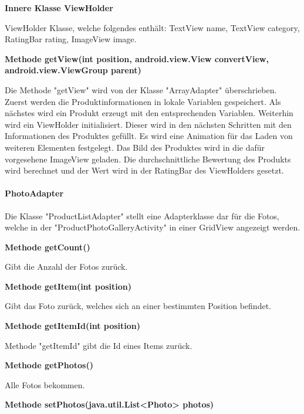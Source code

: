 \documentclass{scrartcl}
\begin{document}
\noindent\textbf{Innere Klasse ViewHolder}

\noindent ViewHolder Klasse, welche folgendes enthält: TextView name, TextView category, RatingBar rating, ImageView image. \newline 

\noindent\textbf{Methode getView(int position, \newline                                android.view.View convertView, android.view.ViewGroup parent)}

\noindent Die Methode "getView" wird von der Klasse "ArrayAdapter" überschrieben. Zuerst werden die Produktinformationen in lokale Variablen gespeichert. Als nächstes wird ein Produkt erzeugt mit den entsprechenden Variablen. Weiterhin wird ein ViewHolder initialisiert. Dieser wird in den nächsten Schritten mit den Informationen des Produktes gefüllt. Es wird eine Animation für das Laden von weiteren Elementen festgelegt. Das Bild des Produktes wird in die dafür vorgesehene ImageView geladen. Die durchschnittliche Bewertung des Produkts wird berechnet und der Wert wird in der RatingBar des ViewHolders gesetzt. \newline 

\paragraph{PhotoAdapter}
Die Klasse "ProductListAdapter" stellt eine Adapterklasse dar für die Fotos, welche in der "ProductPhotoGalleryActivity" in einer GridView angezeigt werden. \newline 

\noindent\textbf{Methode getCount()}

\noindent Gibt die Anzahl der Fotos zurück. \newline 

\noindent\textbf{Methode getItem(int position)}

\noindent Gibt das Foto zurück, welches sich an einer bestimmten Position befindet. \newline 

\noindent\textbf{Methode getItemId(int position)}

\noindent Methode "getItemId" gibt die Id eines Items zurück. \newline 

\noindent\textbf{Methode getPhotos()}

\noindent Alle Fotos bekommen. \newline 

\noindent\textbf{Methode setPhotos(java.util.List<Photo> photos)}
\end{document}
